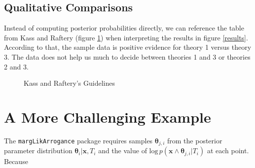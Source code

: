 \documentclass[letterpaper,12pt]{article}
\newcommand{\bx}{\boldsymbol x}
\newcommand{\btheta}{\boldsymbol \theta}%
\begin{document}
\subsection{Qualitative Comparisons}

Instead of computing posterior probabilities directly, we can
reference the table from Kass and Raftery (figure \ref{guidelines})
when interpreting the results in figure \ref{results}.  According to
that, the sample data is positive evidence for theory 1 versus theory
3.  The data does not help us much to decide between theories 1 and 3
or theories 2 and 3.

\begin{figure}[htp] \normalsize 
\begin{center}
 \caption{Kass and Raftery's Guidelines} \label{guidelines} \end{center}\end{figure}

\section{A More Challenging Example}

The \texttt{margLikArrogance} package requires samples $\btheta_{j,i}$
from the posterior parameter distribution $\btheta_i|\bx,T_i$ and the
value of $\mbox{log}\, p(\bx \wedge \btheta_{j,i}|T_i)$ at each point.
Because 
\end{document}

